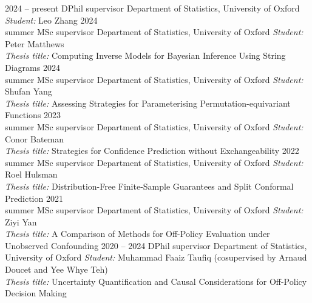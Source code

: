 \documentclass[9pt]{developercv} %
\begin{document}
\begin{entrylist}
    \entry
        {2024 -- present}
        {DPhil supervisor}
        {Department of Statistics, University of Oxford}
        {\emph{Student:} Leo Zhang}
    \entry
        {2024\\\footnotesize{summer}}
        {MSc supervisor}
        {Department of Statistics, University of Oxford}
        {\emph{Student:} Peter Matthews \\ \emph{Thesis title:} Computing Inverse Models for Bayesian Inference Using String Diagrams}
    \entry
        {2024\\\footnotesize{summer}}
        {MSc supervisor}
        {Department of Statistics, University of Oxford}
        {\emph{Student:} Shufan Yang \\ \emph{Thesis title:} Assessing Strategies for Parameterising Permutation-equivariant Functions}
    \entry
        {2023\\\footnotesize{summer}}
        {MSc supervisor}
        {Department of Statistics, University of Oxford}
        {\emph{Student:} Conor Bateman \\ \emph{Thesis title:} Strategies for Confidence Prediction without Exchangeability}
    \entry
        {2022\\\footnotesize{summer}}
        {MSc supervisor}
        {Department of Statistics, University of Oxford}
        {\emph{Student:} Roel Hulsman \\ \emph{Thesis title:} Distribution-Free Finite-Sample Guarantees and Split Conformal Prediction}
    \entry
        {2021\\\footnotesize{summer}}
        {MSc supervisor}
        {Department of Statistics, University of Oxford}
        {\emph{Student:} Ziyi Yan \\ \emph{Thesis title:} A Comparison of Methods for Off-Policy Evaluation under Unobserved Confounding}
    \entry
        {2020 -- 2024}
        {DPhil supervisor}
        {Department of Statistics, University of Oxford}
        {\emph{Student:} Muhammad Faaiz Taufiq (cosupervised by Arnaud Doucet and Yee Whye Teh) \\
        \emph{Thesis title:} Uncertainty Quantification and Causal Considerations for Off-Policy Decision Making}
\end{entrylist}
\end{document}
